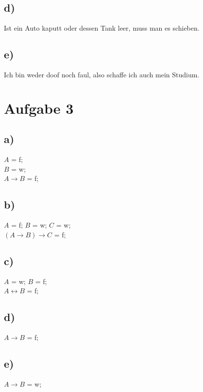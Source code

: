 \documentclass{article}
\begin{document}
	\subsection*{d)}
	Ist ein Auto kaputt oder dessen Tank leer, muss man es schieben.
	\subsection*{e)}
	Ich bin weder doof noch faul, also schaffe ich auch mein Studium.
	
	\section*{Aufgabe 3}
	\subsection*{a)}
	$A$ = f; \\
	$B$ = w; \\
	$A \to B$ = f; \\
	\subsection*{b)}
	$A$ = f; $B$ = w; $C$ = w; \\
	$(A \to B) \to C$ = f; \\
	\subsection*{c)}
	$A$ = w; $B$ = f; \\
	$A \leftrightarrow B$ = f; \\
	
	\subsection*{d)}
	$A \to B$ = f; \\
	\subsection*{e)}
	$A \to B$ = w; \\
\end{document}
